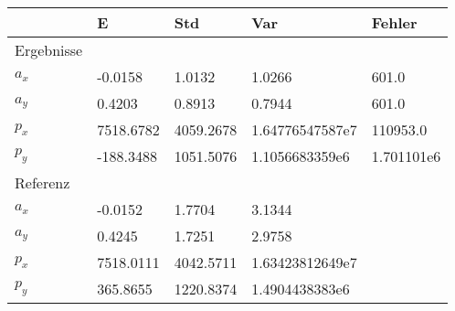 \begin{tabular}{l|l|l|l|l}

     & E   & Std    & Var    & Fehler \\ 

\hline 

\hline 


Ergebnisse & & & & \\ 

$a_x$  & -0.0158 & 1.0132 & 1.0266 & 601.0 \\ 

$a_y$  & 0.4203 & 0.8913 & 0.7944 & 601.0 \\ 

$p_x$  & 7518.6782 & 4059.2678 & 1.64776547587e7 & 110953.0 \\ 

$p_y$  & -188.3488 & 1051.5076 & 1.1056683359e6 & 1.701101e6 \\ 


\hline 

Referenz & & & & \\ 

$a_x$  & -0.0152 & 1.7704 & 3.1344 & \\ 

$a_y$  & 0.4245 & 1.7251 & 2.9758 & \\ 

$p_x$  & 7518.0111 & 4042.5711 & 1.63423812649e7 & \\ 

$p_y$  & 365.8655 & 1220.8374 & 1.4904438383e6 & \\ 

\end{tabular}
